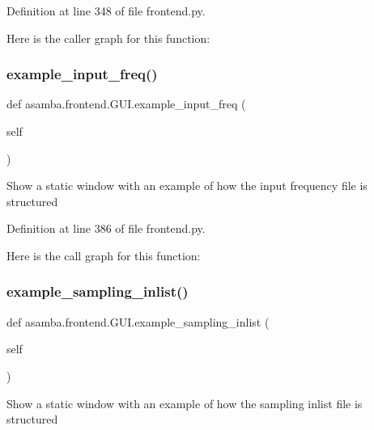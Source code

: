 Definition at line 348 of file frontend.\+py.

Here is the caller graph for this function\+:
\mbox{\label{classasamba_1_1frontend_1_1_g_u_i_a515d6655fbf006441ec5ac9b96e5bd7c}} 
\subsubsection{\texorpdfstring{example\+\_\+input\+\_\+freq()}{example\_input\_freq()}}
{\footnotesize\ttfamily def asamba.\+frontend.\+G\+U\+I.\+example\+\_\+input\+\_\+freq (\begin{DoxyParamCaption}\item[{}]{self }\end{DoxyParamCaption})}

\begin{DoxyVerb}Show a static window with an example of how the input frequency file is structured \end{DoxyVerb}
 

Definition at line 386 of file frontend.\+py.

Here is the call graph for this function\+:
\mbox{\label{classasamba_1_1frontend_1_1_g_u_i_a1a0a42d5c06ceb02b8a48dd7ff2f686e}} 
\subsubsection{\texorpdfstring{example\+\_\+sampling\+\_\+inlist()}{example\_sampling\_inlist()}}
{\footnotesize\ttfamily def asamba.\+frontend.\+G\+U\+I.\+example\+\_\+sampling\+\_\+inlist (\begin{DoxyParamCaption}\item[{}]{self }\end{DoxyParamCaption})}

\begin{DoxyVerb}Show a static window with an example of how the sampling inlist file is structured \end{DoxyVerb}
 

